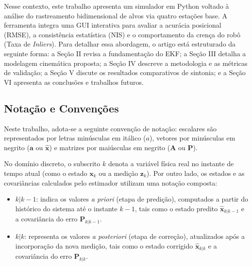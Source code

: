 Nesse contexto, este trabalho apresenta um simulador em Python voltado à análise do rastreamento bidimensional de alvos via quatro estações base. A ferramenta integra uma GUI interativa para avaliar a acurácia posicional (RMSE), a consistência estatística (NIS) e o comportamento da crença do robô (Taxa de \textit{Inliers}). Para detalhar essa abordagem, o artigo está estruturado da seguinte forma: a Seção II revisa a fundamentação do EKF; a Seção III detalha a modelagem cinemática proposta; a Seção IV descreve a metodologia e as métricas de validação; a Seção V discute os resultados comparativos de sintonia; e a Seção VI apresenta as conclusões e trabalhos futuros.


\subsection{Notação e Convenções}
\label{subsec:notation}

Neste trabalho, adota-se a seguinte convenção de notação: escalares são representados por letras minúsculas em itálico ($a$), vetores por minúsculas em negrito ($\mathbf{a}$ ou $\hat{\mathbf{x}}$) e matrizes por maiúsculas em negrito ($\mathbf{A}$ ou $\mathbf{P}$).

No domínio discreto, o subscrito $k$ denota a variável física real no instante de tempo atual (como o estado $\mathbf{x}_k$ ou a medição $\mathbf{z}_k$). Por outro lado, os estados e as covariâncias calculados pelo estimador utilizam uma notação composta:
\begin{itemize}
    \item $k|k-1$: indica os valores \textit{a priori} (etapa de predição), computados a partir do histórico do sistema até o instante $k-1$, tais como o estado predito $\hat{\mathbf{x}}_{k|k-1}$ e a covariância do erro $\mathbf{P}_{k|k-1}$.
    \item $k|k$: representa os valores \textit{a posteriori} (etapa de correção), atualizados após a incorporação da nova medição, tais como o estado corrigido $\hat{\mathbf{x}}_{k|k}$ e a covariância do erro $\mathbf{P}_{k|k}$.
\end{itemize}